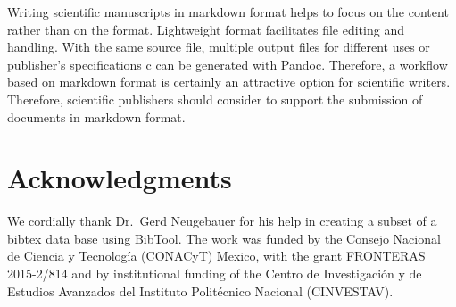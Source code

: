 \documentclass[10pt,fleq]{wlpeerj}
\begin{document}
Writing
scientific
manuscripts
in
markdown
format
helps to
focus on
the
content
rather
than on
the
format.
Lightweight
format
facilitates
file
editing
and
handling.
With the
same
source
file,
multiple
output
files for
different
uses or
publisher's
specifications
c can be
generated
with
Pandoc.
Therefore,
a workflow
based on
markdown
format is
certainly
an
attractive
option for
scientific
writers.
Therefore,
scientific
publishers
should
consider
to support
the
submission
of
documents
in
markdown
format.

\section{Acknowledgments}\label{acknowledgments}

We
cordially
thank
Dr.~Gerd
Neugebauer
for his
help in
creating a
subset of
a bibtex
data base
using
BibTool.
The work
was funded
by the
Consejo
Nacional
de Ciencia
y
Tecnología
(CONACyT)
Mexico,
with the
grant
FRONTERAS
2015-2/814
and by
institutional
funding of
the Centro
de
Investigación
y de
Estudios
Avanzados
del
Instituto
Politécnico
Nacional
(CINVESTAV).

\renewcommand\refname{Bibliography}

\end{document}

